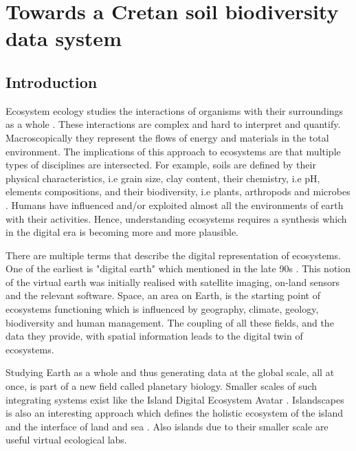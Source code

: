 % 
% 


\chapter{Towards a Cretan soil biodiversity data system}
\label{cha:crete-idea}

\section{Introduction}\label{intro_idea}

Ecosystem ecology studies the interactions of organisms with their surroundings
as a whole \parencite{van-dyne1966ecosystems}. These interactions are complex and hard to interpret and quantify.
Macroscopically they represent the flows of energy and materials in the total environment.
The implications of this approach to ecosystems are that multiple types of disciplines 
are intersected. For example, soils are defined by their physical characteristics,
i.e grain size, clay content, their chemistry, i.e pH, elements compositions, and 
their biodiversity, i.e plants, arthropods and microbes \parencite{vogel2022}. Humans have influenced 
and/or exploited almost all the environments of earth with their activities.
Hence, understanding ecosystems requires a synthesis which in the digital era 
is becoming more and more plausible. 

There are multiple terms that describe the digital representation of ecosystems.
One of the earliest is "digital earth" which mentioned in the late 90s \parencite{Goodchild_2012}.
This notion of the virtual earth was initially realised with satellite imaging,
on-land sensors and the relevant software. Space, an area on Earth, is
the starting point of ecosystems functioning which is influenced by geography,
climate, geology, biodiversity and human management. The coupling of all these
fields, and the data they provide, with spatial information leads to the digital twin of ecosystems.

Studying Earth as a whole and thus generating data at the global scale, all at once,
is part of a new field called planetary biology. Smaller scales of such integrating systems exist like
the Island Digital Ecosystem Avatar \parencite{Davies2016}. Islandscapes 
is also an interesting approach which defines the holistic ecosystem of the island
and the interface of land and sea \parencite{Vogiatzakis_land_2017}. Also islands
due to their smaller scale are useful virtual ecological labs.


